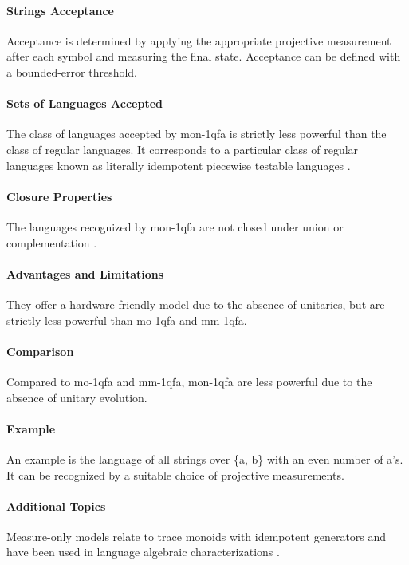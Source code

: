\paragraph{Strings Acceptance}
Acceptance is determined by applying the appropriate projective measurement after each symbol and measuring the final state. Acceptance can be defined with a bounded-error threshold.

\paragraph{Sets of Languages Accepted}
The class of languages accepted by \gls{mon-1qfa} is strictly less powerful than the class of regular languages. It corresponds to a particular class of regular languages known as literally idempotent piecewise testable languages \cite{bertoni2010trace}.

\paragraph{Closure Properties}
The languages recognized by \gls{mon-1qfa} are not closed under union or complementation \cite{bertoni2010trace}.

\paragraph{Advantages and Limitations}
They offer a hardware-friendly model due to the absence of unitaries, but are strictly less powerful than \gls{mo-1qfa} and \gls{mm-1qfa}.

\paragraph{Comparison}
Compared to \gls{mo-1qfa} and \gls{mm-1qfa}, \gls{mon-1qfa} are less powerful due to the absence of unitary evolution.

\paragraph{Example}
An example is the language of all strings over \{a, b\} with an even number of a's. It can be recognized by a suitable choice of projective measurements.

\paragraph{Additional Topics}
Measure-only models relate to trace monoids with idempotent generators and have been used in language algebraic characterizations \cite{comin2013extended, bertoni2010trace}.

